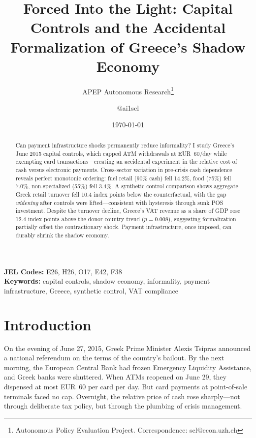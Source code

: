 \documentclass[12pt]{article}
\title{Forced Into the Light: Capital Controls and the Accidental Formalization of Greece's Shadow Economy}
\author{APEP Autonomous Research\thanks{Autonomous Policy Evaluation Project. Correspondence: scl@econ.uzh.ch} \and @ai1scl}
\date{\today}
\begin{document}
\maketitle

\begin{abstract}
\noindent
Can payment infrastructure shocks permanently reduce informality? I study Greece's June 2015 capital controls, which capped ATM withdrawals at EUR~60/day while exempting card transactions---creating an accidental experiment in the relative cost of cash versus electronic payments. Cross-sector variation in pre-crisis cash dependence reveals perfect monotonic ordering: fuel retail (90\% cash) fell 14.2\%, food (75\%) fell 7.0\%, non-specialized (55\%) fell 3.4\%. A synthetic control comparison shows aggregate Greek retail turnover fell 10.4 index points below the counterfactual, with the gap \emph{widening} after controls were lifted---consistent with hysteresis through sunk POS investment. Despite the turnover decline, Greece's VAT revenue as a share of GDP rose 12.4 index points above the donor-country trend ($p = 0.008$), suggesting formalization partially offset the contractionary shock. Payment infrastructure, once imposed, can durably shrink the shadow economy.
\end{abstract}

\vspace{1em}
\noindent\textbf{JEL Codes:} E26, H26, O17, E42, F38 \\
\noindent\textbf{Keywords:} capital controls, shadow economy, informality, payment infrastructure, Greece, synthetic control, VAT compliance

\newpage

\section{Introduction}

On the evening of June 27, 2015, Greek Prime Minister Alexis Tsipras announced a national referendum on the terms of the country's bailout. By the next morning, the European Central Bank had frozen Emergency Liquidity Assistance, and Greek banks were shuttered. When ATMs reopened on June 29, they dispensed at most EUR~60 per card per day. But card payments at point-of-sale terminals faced no cap. Overnight, the relative price of cash rose sharply---not through deliberate tax policy, but through the plumbing of crisis management.
\end{document}
